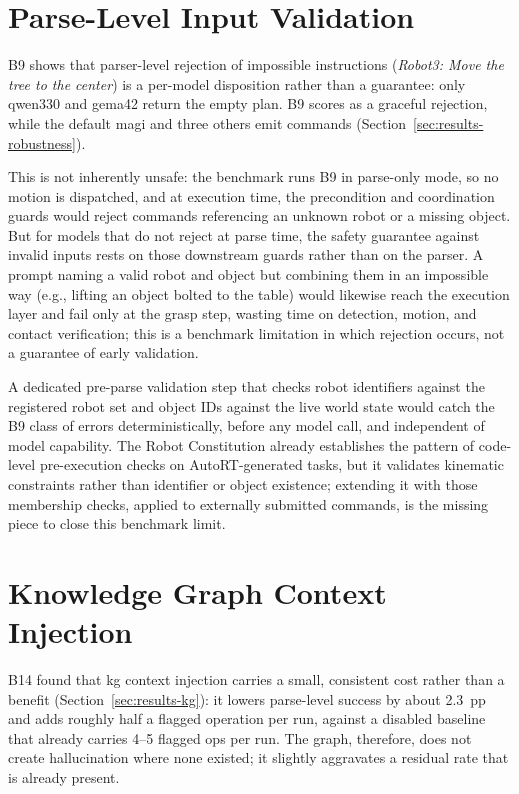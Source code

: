 \documentclass[
     12pt,
     a4paper,
     BCOR=10mm,
     DIV=14,
     listof=totoc,
     bibliography=totoc,
     parskip,
     twoside,
     headsepline
     ]{scrreprt}
\begin{document}
\section{Parse-Level Input Validation}\label{sec:parse-validation}
B9 shows that parser-level rejection of impossible instructions (\textit{Robot3: Move the tree to the center}) is a per-model disposition rather than a guarantee: only \gls{qwen330} and \gls{gema42} return the empty plan. B9 scores as a graceful rejection, while the default \gls{magi} and three others emit commands (Section~\ref{sec:results-robustness}).

This is not inherently unsafe: the benchmark runs B9 in parse-only mode, so no motion is dispatched, and at execution time, the precondition and coordination guards would reject commands referencing an unknown robot or a missing object. But for models that do not reject at parse time, the safety guarantee against invalid inputs rests on those downstream guards rather than on the parser. A prompt naming a valid robot and object but combining them in an impossible way (e.g., lifting an object bolted to the table) would likewise reach the execution layer and fail only at the grasp step, wasting time on detection, motion, and contact verification; this is a benchmark limitation in which rejection occurs, not a guarantee of early validation.

A dedicated pre-parse validation step that checks robot identifiers against the registered robot set and object IDs against the live world state would catch the B9 class of errors deterministically, before any model call, and independent of model capability. The Robot Constitution already establishes the pattern of code-level pre-execution checks on AutoRT-generated tasks, but it validates kinematic constraints rather than identifier or object existence; extending it with those membership checks, applied to externally submitted commands, is the missing piece to close this benchmark limit.

\section{Knowledge Graph Context Injection}
B14 found that \gls{kg} context injection carries a small, consistent cost rather than a benefit (Section~\ref{sec:results-kg}): it lowers parse-level success by about 2.3~pp and adds roughly half a flagged operation per run, against a disabled baseline that already carries 4--5 flagged ops per run. The graph, therefore, does not create hallucination where none existed; it slightly aggravates a residual rate that is already present.
\end{document}
